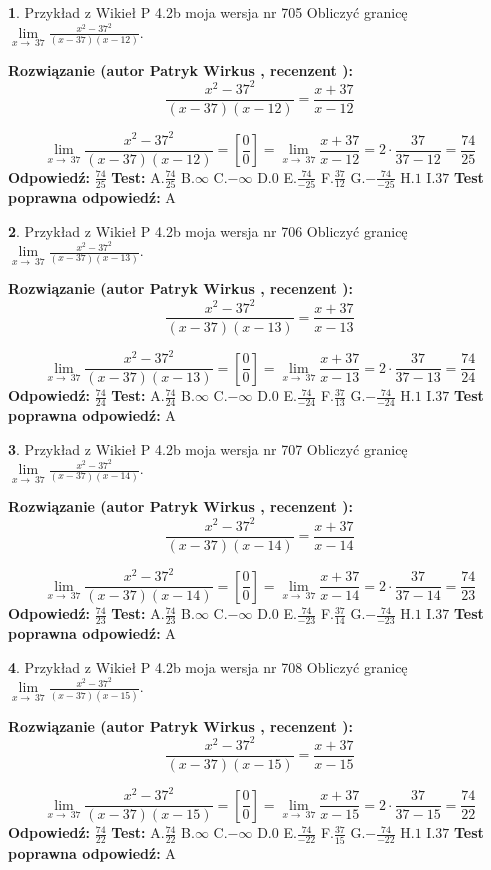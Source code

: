 \documentclass[12pt, a4paper]{article}
\theoremstyle{definition} %
\newtheorem{zad}{}
\newcommand{\zadStart}[1]{\begin{zad}#1\newline}
\newcommand{\zadStop}{\end{zad}}
\newcommand{\rozwStart}[2]{\noindent \textbf{Rozwiązanie (autor #1 , recenzent #2): }\newline}
\newcommand{\rozwStop}{\newline}
\newcommand{\odpStart}{\noindent \textbf{Odpowiedź:}\newline}
\newcommand{\odpStop}{\newline}
\newcommand{\testStart}{\noindent \textbf{Test:}\newline}
\newcommand{\testStop}{\newline}
\newcommand{\kluczStart}{\noindent \textbf{Test poprawna odpowiedź:}\newline}
\newcommand{\kluczStop}{\newline}
\begin{document}
\zadStart{Przykład z Wikieł P 4.2b moja wersja nr 705}
Obliczyć granicę $\lim\limits_{x\to\ 37}\frac{x^{2}-37^{2}}{(x-37)(x-12)}$.
\zadStop
\rozwStart{Patryk Wirkus}{}
$$\frac{x^{2}-37^{2}}{(x-37)(x-12)}=\frac{x+37}{x-12}$$

$$\lim\limits_{x\to\ 37}\frac{x^{2}-37^{2}}{(x-37)(x-12)}=[\frac{0}{0}]=\lim\limits_{x\to\ 37}\frac{x+37}{x-12}=2 \cdot \frac{37}{37-12} = \frac{74}{25}$$
\rozwStop
\odpStart
$\frac{74}{25}$
\odpStop
\testStart
A.$\frac{74}{25}$
B.$\infty$
C.$-\infty$
D.$0$
E.$\frac{74}{-25}$
F.$\frac{37}{12}$
G.$-\frac{74}{-25}$
H.$1$
I.$37$
\testStop
\kluczStart
A
\kluczStop



\zadStart{Przykład z Wikieł P 4.2b moja wersja nr 706}
Obliczyć granicę $\lim\limits_{x\to\ 37}\frac{x^{2}-37^{2}}{(x-37)(x-13)}$.
\zadStop
\rozwStart{Patryk Wirkus}{}
$$\frac{x^{2}-37^{2}}{(x-37)(x-13)}=\frac{x+37}{x-13}$$

$$\lim\limits_{x\to\ 37}\frac{x^{2}-37^{2}}{(x-37)(x-13)}=[\frac{0}{0}]=\lim\limits_{x\to\ 37}\frac{x+37}{x-13}=2 \cdot \frac{37}{37-13} = \frac{74}{24}$$
\rozwStop
\odpStart
$\frac{74}{24}$
\odpStop
\testStart
A.$\frac{74}{24}$
B.$\infty$
C.$-\infty$
D.$0$
E.$\frac{74}{-24}$
F.$\frac{37}{13}$
G.$-\frac{74}{-24}$
H.$1$
I.$37$
\testStop
\kluczStart
A
\kluczStop



\zadStart{Przykład z Wikieł P 4.2b moja wersja nr 707}
Obliczyć granicę $\lim\limits_{x\to\ 37}\frac{x^{2}-37^{2}}{(x-37)(x-14)}$.
\zadStop
\rozwStart{Patryk Wirkus}{}
$$\frac{x^{2}-37^{2}}{(x-37)(x-14)}=\frac{x+37}{x-14}$$

$$\lim\limits_{x\to\ 37}\frac{x^{2}-37^{2}}{(x-37)(x-14)}=[\frac{0}{0}]=\lim\limits_{x\to\ 37}\frac{x+37}{x-14}=2 \cdot \frac{37}{37-14} = \frac{74}{23}$$
\rozwStop
\odpStart
$\frac{74}{23}$
\odpStop
\testStart
A.$\frac{74}{23}$
B.$\infty$
C.$-\infty$
D.$0$
E.$\frac{74}{-23}$
F.$\frac{37}{14}$
G.$-\frac{74}{-23}$
H.$1$
I.$37$
\testStop
\kluczStart
A
\kluczStop



\zadStart{Przykład z Wikieł P 4.2b moja wersja nr 708}
Obliczyć granicę $\lim\limits_{x\to\ 37}\frac{x^{2}-37^{2}}{(x-37)(x-15)}$.
\zadStop
\rozwStart{Patryk Wirkus}{}
$$\frac{x^{2}-37^{2}}{(x-37)(x-15)}=\frac{x+37}{x-15}$$

$$\lim\limits_{x\to\ 37}\frac{x^{2}-37^{2}}{(x-37)(x-15)}=[\frac{0}{0}]=\lim\limits_{x\to\ 37}\frac{x+37}{x-15}=2 \cdot \frac{37}{37-15} = \frac{74}{22}$$
\rozwStop
\odpStart
$\frac{74}{22}$
\odpStop
\testStart
A.$\frac{74}{22}$
B.$\infty$
C.$-\infty$
D.$0$
E.$\frac{74}{-22}$
F.$\frac{37}{15}$
G.$-\frac{74}{-22}$
H.$1$
I.$37$
\testStop
\kluczStart
A
\kluczStop
\end{document}
